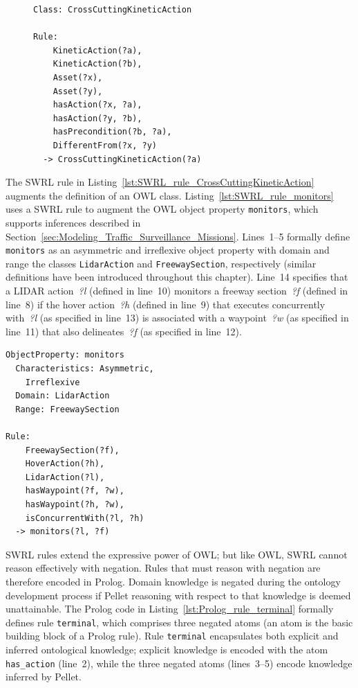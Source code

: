\begin{figure}[ht]
\begin{lstlisting}[caption={OWL+SWRL code for rule \texttt{CrossCuttingKineticAction}},label=lst:SWRL_rule_CrossCuttingKineticAction]
Class: CrossCuttingKineticAction

Rule:
    KineticAction(?a),
    KineticAction(?b),
    Asset(?x),
    Asset(?y),
    hasAction(?x, ?a),
    hasAction(?y, ?b),
    hasPrecondition(?b, ?a),
    DifferentFrom(?x, ?y)
  -> CrossCuttingKineticAction(?a)
\end{lstlisting}
\end{figure}

The SWRL rule in Listing~\ref{lst:SWRL_rule_CrossCuttingKineticAction} augments the definition of an OWL class. Listing~\ref{lst:SWRL_rule_monitors} uses a SWRL rule to augment the OWL object property \texttt{monitors}, which supports inferences described in Section~\ref{sec:Modeling_Traffic_Surveillance_Missions}. Lines~1--5 formally define \texttt{monitors} as an asymmetric and irreflexive object property with domain and range the classes \texttt{LidarAction} and \texttt{FreewaySection}, respectively (similar definitions have been introduced throughout this chapter). Line~14 specifies that a LIDAR action~\emph{?l} (defined in line~10) monitors a freeway section~\emph{?f} (defined in line~8) if the hover action~\emph{?h} (defined in line~9) that executes concurrently with~\emph{?l} (as specified in line~13) is associated with a waypoint~\emph{?w} (as specified in line~11) that also delineates~\emph{?f} (as specified in line~12).

\begin{lstlisting}[caption={OWL+SWRL code for rule \texttt{monitors}},label=lst:SWRL_rule_monitors]
ObjectProperty: monitors
  Characteristics: Asymmetric,
    Irreflexive
  Domain: LidarAction
  Range: FreewaySection

Rule:
    FreewaySection(?f),
    HoverAction(?h),
    LidarAction(?l),
    hasWaypoint(?f, ?w),
    hasWaypoint(?h, ?w),
    isConcurrentWith(?l, ?h)
  -> monitors(?l, ?f)
\end{lstlisting}

SWRL rules extend the expressive power of OWL; but like OWL, SWRL cannot reason effectively with negation. Rules that must reason with negation are therefore encoded in Prolog. Domain knowledge is negated during the ontology development process if Pellet reasoning with respect to that knowledge is deemed unattainable. The Prolog code in Listing~\ref{lst:Prolog_rule_terminal} formally defines rule \texttt{terminal}, which comprises three negated atoms (an atom is the basic building block of a Prolog rule). Rule \texttt{terminal} encapsulates both explicit and inferred ontological knowledge; explicit knowledge is encoded with the atom \texttt{has\_action} (line~2), while the three negated atoms (lines~3--5) encode knowledge inferred by Pellet.

